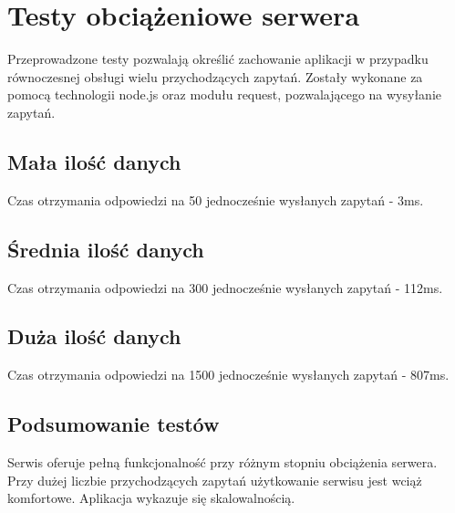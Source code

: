\documentclass[12pt]{report}
\begin{document}
\section{Testy obciążeniowe serwera}
Przeprowadzone testy pozwalają określić zachowanie aplikacji w przypadku równoczesnej obsługi wielu przychodzących zapytań. Zostały wykonane za pomocą technologii node.js oraz modułu request, pozwalającego na wysyłanie zapytań.

\subsection{Mała ilość danych}
Czas otrzymania odpowiedzi na 50 jednocześnie wysłanych zapytań - 3ms.

\subsection{Średnia ilość danych}
Czas otrzymania odpowiedzi na 300 jednocześnie wysłanych zapytań - 112ms.

\subsection{Duża ilość danych}
Czas otrzymania odpowiedzi na 1500 jednocześnie wysłanych zapytań - 807ms.

\subsection{Podsumowanie testów}
Serwis oferuje pełną funkcjonalność przy różnym stopniu obciążenia serwera. Przy dużej liczbie przychodzących zapytań użytkowanie serwisu jest wciąż komfortowe. Aplikacja wykazuje się skalowalnością.
\end{document}
